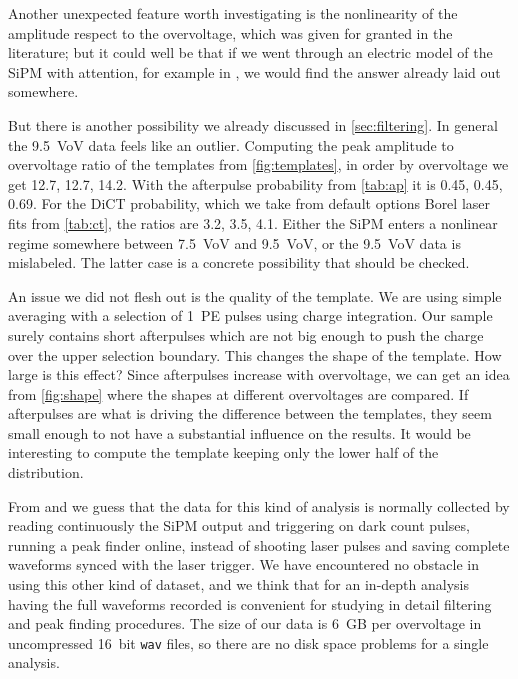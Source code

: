 
Another unexpected feature worth investigating is the nonlinearity of the
amplitude respect to the overvoltage, which was given for granted in the
literature; but it could well be that if we went through an electric model of
the SiPM with attention, for example in \cite[ch.~3]{savarese2018}, we would
find the answer already laid out somewhere.

But there is another possibility we already discussed in
\autoref{sec:filtering}. In general the \SI{9.5}{VoV} data feels like an
outlier. Computing the peak amplitude to overvoltage ratio of the templates
from \autoref{fig:templates}, in order by overvoltage we get 12.7, 12.7, 14.2.
With the afterpulse probability from \autoref{tab:ap} it is 0.45, 0.45, 0.69.
For the DiCT probability, which we take from default options Borel laser fits
from \autoref{tab:ct}, the ratios are 3.2, 3.5, 4.1. Either the SiPM enters a
nonlinear regime somewhere between \SI{7.5}{VoV} and \SI{9.5}{VoV}, or the
\SI{9.5}{VoV} data is mislabeled. The latter case is a concrete possibility
that should be checked.


An issue we did not flesh out is the quality of the template. We are using
simple averaging with a selection of 1~PE pulses using charge integration. Our
sample surely contains short afterpulses which are not big enough to push the
charge over the upper selection boundary. This changes the shape of the
template. How large is this effect? Since afterpulses increase with
overvoltage, we can get an idea from \autoref{fig:shape} where the shapes at
different overvoltages are compared. If afterpulses are what is driving the
difference between the templates, they seem small enough to not have a
substantial influence on the results. It would be interesting to compute the
template keeping only the lower half of the distribution.

From \cite{savarese2018} and \cite{nagy2014} we guess that the data for this
kind of analysis is normally collected by reading continuously the SiPM output
and triggering on dark count pulses, running a peak finder online, instead of
shooting laser pulses and saving complete waveforms synced with the laser
trigger. We have encountered no obstacle in using this other kind of dataset,
and we think that for an in-depth analysis having the full waveforms recorded
is convenient for studying in detail filtering and peak finding procedures. The
size of our data is \SI{6}{GB} per overvoltage in uncompressed \SI{16}{bit}
\texttt{wav} files, so there are no disk space problems for a single analysis.

